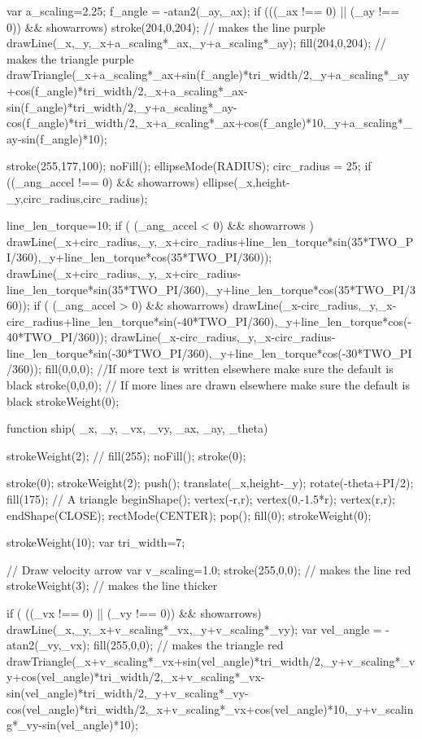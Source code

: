 \documentclass{ximera}
\begin{document}
\begin{javascriptCode}
{{    var a_scaling=2.25;
    f_angle = -atan2(_ay,_ax);
    if (((_ax !== 0) || (_ay !== 0)) && showarrows) {
    stroke(204,0,204); // makes the line purple
    drawLine(_x,_y,_x+a_scaling*_ax,_y+a_scaling*_ay);
    fill(204,0,204); // makes the triangle purple
    drawTriangle(_x+a_scaling*_ax+sin(f_angle)*tri_width/2,_y+a_scaling*_ay+cos(f_angle)*tri_width/2,_x+a_scaling*_ax-sin(f_angle)*tri_width/2,_y+a_scaling*_ay-cos(f_angle)*tri_width/2,_x+a_scaling*_ax+cos(f_angle)*10,_y+a_scaling*_ay-sin(f_angle)*10);
    }

    stroke(255,177,100);
    noFill();
    ellipseMode(RADIUS); 
    circ_radius = 25;   
    if ((_ang_accel !== 0) && showarrows) {
    ellipse(_x,height-_y,circ_radius,circ_radius);
    }

    line_len_torque=10;
    if ( (_ang_accel < 0) && showarrows ) {
	drawLine(_x+circ_radius,_y,_x+circ_radius+line_len_torque*sin(35*TWO_PI/360),_y+line_len_torque*cos(35*TWO_PI/360));
	drawLine(_x+circ_radius,_y,_x+circ_radius-line_len_torque*sin(35*TWO_PI/360),_y+line_len_torque*cos(35*TWO_PI/360));
    }
    if ( (_ang_accel > 0) && showarrows) {
	drawLine(_x-circ_radius,_y,_x-circ_radius+line_len_torque*sin(-40*TWO_PI/360),_y+line_len_torque*cos(-40*TWO_PI/360));
	drawLine(_x-circ_radius,_y,_x-circ_radius-line_len_torque*sin(-30*TWO_PI/360),_y+line_len_torque*cos(-30*TWO_PI/360));
    }
      fill(0,0,0); //If more text is written elsewhere make sure the default is black
    stroke(0,0,0); // If more lines are drawn elsewhere make sure the default is black
    strokeWeight(0);

}

function ship( _x,  _y, _vx, _vy, _ax, _ay, _theta)
{
    strokeWeight(2);
    //    fill(255);
    noFill();
    stroke(0);

    stroke(0);
    strokeWeight(2);
    push();
    translate(_x,height-_y);
    rotate(-theta+PI/2);
    fill(175);
    // A triangle
    beginShape();
    vertex(-r,r);
    vertex(0,-1.5*r);
    vertex(r,r);
    endShape(CLOSE);
    rectMode(CENTER);
    pop();
    fill(0);
    strokeWeight(0);
  
  
  
    strokeWeight(10);
    var tri_width=7;

    // Draw velocity arrow
    var v_scaling=1.0;
    stroke(255,0,0); // makes the line red
    strokeWeight(3); // makes the line thicker

    if ( ((_vx !== 0) || (_vy !== 0)) && showarrows) {
        drawLine(_x,_y,_x+v_scaling*_vx,_y+v_scaling*_vy);
        var vel_angle = -atan2(_vy,_vx);
        fill(255,0,0); // makes the triangle red
        drawTriangle(_x+v_scaling*_vx+sin(vel_angle)*tri_width/2,_y+v_scaling*_vy+cos(vel_angle)*tri_width/2,_x+v_scaling*_vx-sin(vel_angle)*tri_width/2,_y+v_scaling*_vy-cos(vel_angle)*tri_width/2,_x+v_scaling*_vx+cos(vel_angle)*10,_y+v_scaling*_vy-sin(vel_angle)*10);
    }

}}
\end{javascriptCode}
\end{document}
